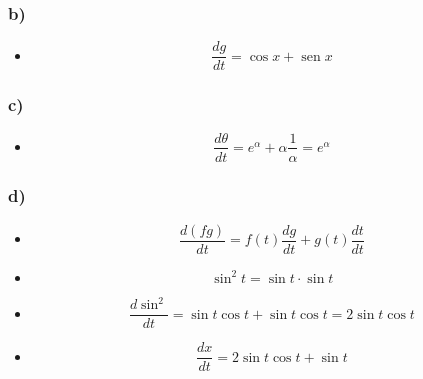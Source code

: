 \documentclass[../main.tex]{subfiles}
\begin{document}
\subsubsection*{b)}

\begin{itemize}
    \item \begin{equation*} \frac{d g}{d t}=\cos x+\operatorname{sen} x\end{equation*}
\end{itemize}


\subsubsection*{c)}

\begin{itemize}
    \item \begin{equation*}\frac{d \theta}{d t}=e^\alpha+\alpha \frac{1}{\alpha}=e^\alpha\end{equation*}
\end{itemize}

\subsubsection*{d)}

\begin{itemize}
    \item \begin{equation*} \frac{d(f g)}{d t}=f(t) \frac{d g}{d t}+g(t) \frac{d t}{d t}\end{equation*} 
    \item \begin{equation*} \sin ^2 t=\sin t \cdot \sin t\end{equation*} 
    \item \begin{equation*} \frac{d \sin ^2}{d t}=\sin t \cos t+\sin t \cos t=2 \sin t \cos t \end{equation*}
    \item \begin{equation*} \frac{d x}{d t}=2 \sin t \cos t+\sin t \end{equation*}
\end{itemize}
\end{document}
